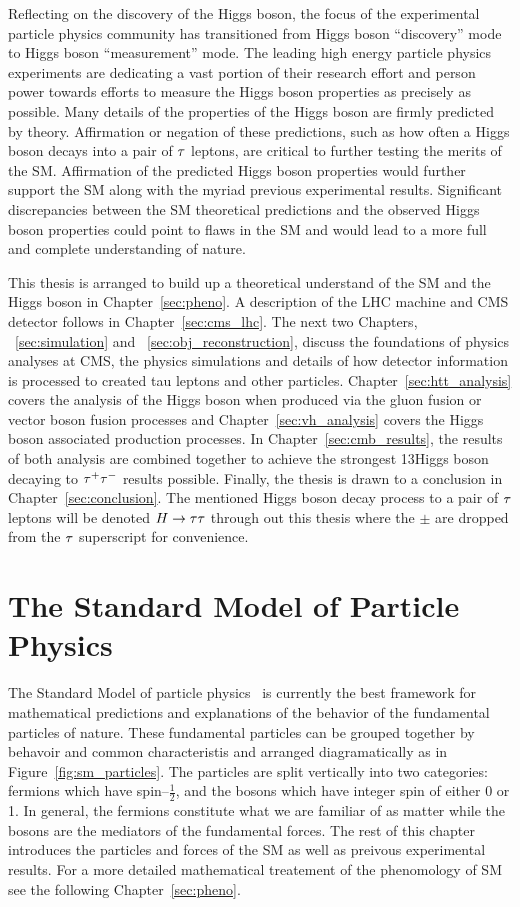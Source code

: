 Reflecting on the discovery of the Higgs boson, the focus of the experimental particle physics community has transitioned from
Higgs boson ``discovery'' mode to Higgs boson ``measurement'' mode. The leading high energy particle physics experiments
are dedicating a vast portion of their research effort and person power towards
efforts to measure the Higgs boson properties as precisely as possible. Many details of the properties of the Higgs
boson are firmly predicted by theory. Affirmation or negation of these predictions,
such as how often a Higgs boson decays into a pair of $\tau$ leptons,
are critical to further testing the merits of the SM. Affirmation of the
predicted Higgs boson properties would further support the SM along with the myriad previous
experimental results. Significant discrepancies between the SM
theoretical predictions and the observed Higgs boson properties could point to
flaws in the SM and would lead to a more full and complete understanding of nature.

This thesis is arranged to build up a theoretical understand of the SM and the
Higgs boson in Chapter~\ref{sec:pheno}. A description of the LHC machine and
CMS detector follows in Chapter~\ref{sec:cms_lhc}. The next two Chapters, ~\ref{sec:simulation} and
~\ref{sec:obj_reconstruction}, discuss the foundations of physics analyses at CMS, the physics
simulations and details of how detector information is processed to created tau
leptons and other particles. Chapter~\ref{sec:htt_analysis} covers the analysis
of the Higgs boson when produced via the gluon fusion or vector boson fusion
processes and Chapter~\ref{sec:vh_analysis} covers the Higgs boson associated
production processes. In Chapter~\ref{sec:cmb_results}, the results of
both analysis are combined together to achieve the strongest 13\TeV Higgs
boson decaying to $\tau^{+}\tau^{-}$ results possible. Finally, the thesis
is drawn to a conclusion in Chapter~\ref{sec:conclusion}.
The mentioned Higgs boson decay process to a pair of $\tau$ leptons will be denoted
$H\to\tau\tau$ through out this thesis where the $\pm$ are dropped from the $\tau$ superscript
for convenience.


\section{The Standard Model of Particle Physics}
The Standard Model of particle physics~\cite{Glashow:1961tr,SM1,SM3} is currently
the best framework for mathematical predictions and explanations of the behavior
of the fundamental particles of nature. These fundamental particles can be grouped
together by behavoir and common characteristis and arranged diagramatically as in
Figure~\ref{fig:sm_particles}. The particles are split vertically into two categories:
fermions which have spin--$\frac{1}{2}$, and the bosons which have integer
spin of either 0 or 1. In general, the fermions constitute what we are familiar of
as matter while the bosons are the mediators of the fundamental forces.
The rest of this chapter introduces the particles and forces of the SM as well
as preivous experimental results. For a more detailed mathematical treatement
of the phenomology of SM see the following Chapter~\ref{sec:pheno}.


